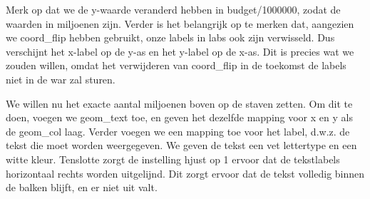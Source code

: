 \documentclass[]{tufte-book}
\newenvironment{Shaded}{}{}
\newcommand{\DataTypeTok}[1]{\textcolor[rgb]{0.56,0.13,0.00}{#1}}
\newcommand{\DecValTok}[1]{\textcolor[rgb]{0.25,0.63,0.44}{#1}}
\newcommand{\KeywordTok}[1]{\textcolor[rgb]{0.00,0.44,0.13}{\textbf{#1}}}
\newcommand{\NormalTok}[1]{#1}
\newcommand{\OperatorTok}[1]{\textcolor[rgb]{0.40,0.40,0.40}{#1}}
\newcommand{\StringTok}[1]{\textcolor[rgb]{0.25,0.44,0.63}{#1}}
\begin{document}
Merk op dat we de y-waarde veranderd hebben in budget/1000000, zodat de waarden in miljoenen zijn. Verder is het belangrijk op te merken dat, aangezien we coord\_flip hebben gebruikt, onze labels in labs ook zijn verwisseld. Dus verschijnt het x-label op de y-as en het y-label op de x-as. Dit is precies wat we zouden willen, omdat het verwijderen van coord\_flip in de toekomst de labels niet in de war zal sturen.

We willen nu het exacte aantal miljoenen boven op de staven zetten. Om dit te doen, voegen we geom\_text toe, en geven het dezelfde mapping voor x en y als de geom\_col laag. Verder voegen we een mapping toe voor het label, d.w.z. de tekst die moet worden weergegeven. We geven de tekst een vet lettertype en een witte kleur. Tenslotte zorgt de instelling hjust op 1 ervoor dat de tekstlabels horizontaal rechts worden uitgelijnd. Dit zorgt ervoor dat de tekst volledig binnen de balken blijft, en er niet uit valt.

\begin{Shaded}
\end{Shaded}
\end{document}
